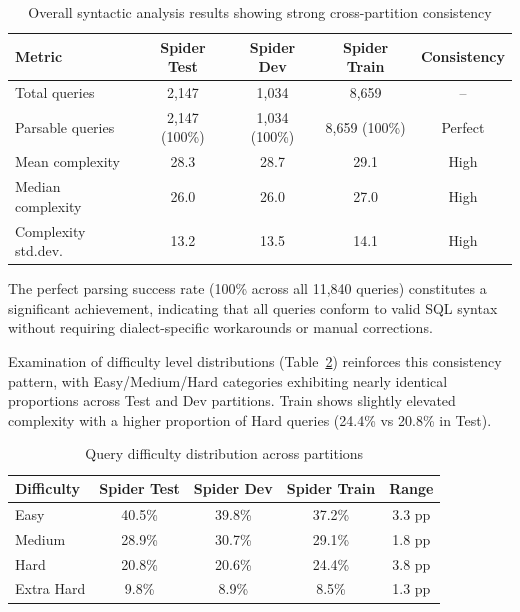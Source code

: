 \documentclass[]{einformatica}
\begin{document}
\begin{table}[ht]
    \caption{Overall syntactic analysis results showing strong cross-partition consistency}
    \label{tab:syntax_overall}
    \centering
    \footnotesize
    \begin{tabular}{lcccc}
        \toprule
        \textbf{Metric} & \textbf{Spider Test} & \textbf{Spider Dev} & \textbf{Spider Train} & \textbf{Consistency} \\
        \midrule
        Total queries & 2,147 & 1,034 & 8,659 & -- \\
        Parsable queries & 2,147 (100\%) & 1,034 (100\%) & 8,659 (100\%) & Perfect \\
        Mean complexity & 28.3 & 28.7 & 29.1 & High \\
        Median complexity & 26.0 & 26.0 & 27.0 & High \\
        Complexity std.dev. & 13.2 & 13.5 & 14.1 & High \\
        \bottomrule
    \end{tabular}
\end{table}

The perfect parsing success rate (100\% across all 11,840 queries) constitutes a significant achievement, indicating that all queries conform to valid SQL syntax without requiring dialect-specific workarounds or manual corrections.

Examination of difficulty level distributions (Table~\ref{tab:difficulty}) reinforces this consistency pattern, with Easy/Medium/Hard categories exhibiting nearly identical proportions across Test and Dev partitions. Train shows slightly elevated complexity with a higher proportion of Hard queries (24.4\% vs 20.8\% in Test).

\begin{table}[ht]
    \caption{Query difficulty distribution across partitions}
    \label{tab:difficulty}
    \centering
    \footnotesize
    \begin{tabular}{lcccc}
        \toprule
        \textbf{Difficulty} & \textbf{Spider Test} & \textbf{Spider Dev} & \textbf{Spider Train} & \textbf{Range} \\
        \midrule
        Easy & 40.5\% & 39.8\% & 37.2\% & 3.3 pp \\
        Medium & 28.9\% & 30.7\% & 29.1\% & 1.8 pp \\
        Hard & 20.8\% & 20.6\% & 24.4\% & 3.8 pp \\
        Extra Hard & 9.8\% & 8.9\% & 8.5\% & 1.3 pp \\
        \bottomrule
    \end{tabular}
\end{table}
\end{document}
